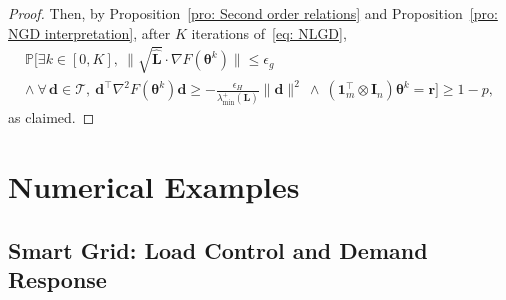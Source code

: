 \documentclass{siamart251216}
\begin{document}
\begin{proof}
    Then, by Proposition~\ref{pro: Second order relations}
    and Proposition~\ref{pro: NGD interpretation},
    after $K$ iterations of~\eqref{eq: NLGD},
    \begin{multline*}
        \mathbb{P}\Bigg[
        \exists k\in[0,K],~
        \|\sqrt{\hat{\mathbf{L}}}\cdot
        \nabla F(\boldsymbol{\theta}^{k})\|
        \le\epsilon_{g}\\
        \land~
        \forall\,\mathbf{d}\in\mathcal{T},~
        \mathbf{d}^{\top}
        \nabla^{2}F(\boldsymbol{\theta}^{k})
        \mathbf{d}
        \ge
        -
        \frac{\epsilon_{H}}
        {\lambda_{\min}^{+}(\mathbf{L})}
        \|\mathbf{d}\|^{2}
        ~\land~
        (\bm{1}_{m}^{\top}\otimes\mathbf{I}_{n})
        \boldsymbol{\theta}^{k}
        =
        \bm{r}
        \Bigg]
        \ge 1-p,
    \end{multline*}
    as claimed.
\end{proof}%

\section{Numerical Examples}
\label{sec: Numerical Examples}
\subsection{Smart Grid: Load Control and Demand Response}
\end{document}
